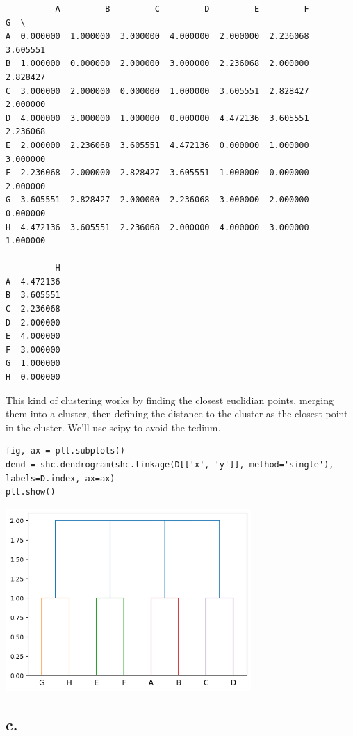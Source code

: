 \documentclass[11pt]{article}
\begin{document}
\begin{verbatim}
          A         B         C         D         E         F         G  \
A  0.000000  1.000000  3.000000  4.000000  2.000000  2.236068  3.605551   
B  1.000000  0.000000  2.000000  3.000000  2.236068  2.000000  2.828427   
C  3.000000  2.000000  0.000000  1.000000  3.605551  2.828427  2.000000   
D  4.000000  3.000000  1.000000  0.000000  4.472136  3.605551  2.236068   
E  2.000000  2.236068  3.605551  4.472136  0.000000  1.000000  3.000000   
F  2.236068  2.000000  2.828427  3.605551  1.000000  0.000000  2.000000   
G  3.605551  2.828427  2.000000  2.236068  3.000000  2.000000  0.000000   
H  4.472136  3.605551  2.236068  2.000000  4.000000  3.000000  1.000000   

          H  
A  4.472136  
B  3.605551  
C  2.236068  
D  2.000000  
E  4.000000  
F  3.000000  
G  1.000000  
H  0.000000  
\end{verbatim}

This kind of clustering works by finding the closest euclidian points, merging
them into a cluster, then defining the distance to the cluster as the closest
point in the cluster. We'll use scipy to avoid the tedium.
\begin{verbatim}
fig, ax = plt.subplots()
dend = shc.dendrogram(shc.linkage(D[['x', 'y']], method='single'), labels=D.index, ax=ax)
plt.show()
\end{verbatim}

\begin{center}
\includegraphics[width=0.7\textwidth]{./.ob-jupyter/9f5d3dc1356fe526c54aa18efddc8612d3017ce8.png}
\end{center}
\subsection*{c.}
\label{sec:orgcf9045b}
\end{document}
